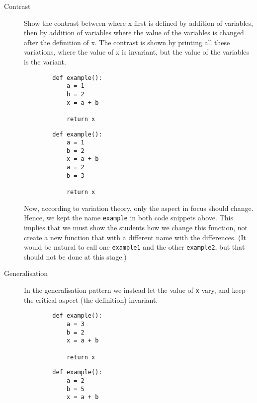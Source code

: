 \begin{description}
    \item [Contrast] Show the contrast between where x first is defined by 
addition of variables, then by addition of variables where the value of 
the variables is changed after the definition of x. The contrast is 
shown by printing all these variations, where the value of x is 
invariant, but the value of the variables is the variant. 

    \hfill
\begin{minipage}[t]{0.45\columnwidth}
    \begin{verbatim}
        def example():
            a = 1
            b = 2
            x = a + b

            return x
    \end{verbatim}
\end{minipage}
\hfill
\begin{minipage}[t]{0.45\columnwidth}
    \begin{verbatim}
        def example():
            a = 1
            b = 2
            x = a + b
            a = 2
            b = 3

            return x
  \end{verbatim}
\end{minipage}
\newline

    Now, according to variation theory, only the aspect in focus should 
change.
    Hence, we kept the name \texttt{example} in both code 
snippets 
    above.
    This implies that we must show the students how we change this function, 
    not create a new function that with a different name with the 
differences.
    (It would be natural to call one \texttt{example1} and the 
    other \texttt{example2}, but that should not be done at this 
    stage.)

    \item [Generalisation] In the generalisation pattern we instead let the 
value of \texttt{x} vary, and keep the critical aspect (the 
definition) invariant. 
    
\hfill
    \begin{minipage}[t]{0.45\columnwidth}
    \begin{verbatim}
        def example():
            a = 3
            b = 2
            x = a + b

            return x
    \end{verbatim}
\end{minipage}
\hfill
\begin{minipage}[t]{0.45\columnwidth}
    \begin{verbatim}
        def example():
            a = 2
            b = 5
            x = a + b


\end{verbatim}
\end{minipage}
\end{description}
